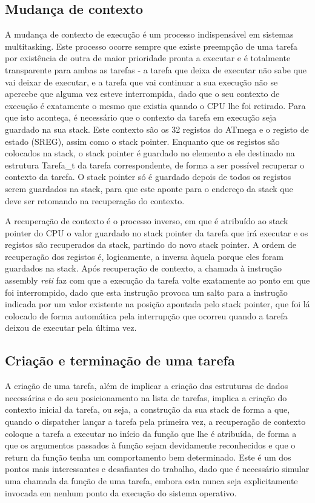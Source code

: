 \documentclass[journal]{IEEEtran}
\begin{document}
\subsection{Mudança de contexto}
A mudança de contexto de execução é um processo indispensável em sistemas multitasking.
Este processo ocorre sempre que existe preempção de uma tarefa por existência de outra de maior prioridade pronta a executar e é totalmente transparente para ambas as
tarefas - a tarefa que deixa de executar não sabe que vai deixar de executar, e a tarefa que vai continuar a sua execução não se apercebe que alguma vez esteve
interrompida, dado que o seu contexto de execução é exatamente o mesmo que existia quando o CPU lhe foi retirado.
Para que isto aconteça, é necessário que o contexto da tarefa em execução seja guardado na sua stack.
Este contexto são os 32 registos do ATmega e o registo de estado (SREG), assim como o stack pointer.
Enquanto que os registos são colocados na stack, o stack pointer é guardado no elemento a ele destinado na estrutura Tarefa\_t da tarefa correspondente, de forma a ser
possível recuperar o contexto da tarefa.
O stack pointer só é guardado depois de todos os registos serem guardados na stack, para que este aponte para o endereço da stack que deve ser retomando na recuperação do
contexto.

A recuperação de contexto é o processo inverso, em que é atribuído ao stack pointer do CPU o valor guardado no stack pointer da tarefa que irá executar e os registos são
recuperados da stack, partindo do novo stack pointer.
A ordem de recuperação dos registos é, logicamente, a inversa àquela porque eles foram guardados na stack.
Após recuperação de contexto, a chamada à instrução assembly \emph{reti} faz com que a execução da tarefa volte exatamente ao ponto em que foi interrompido, dado que esta
instrução provoca um salto para a instrução indicada por um valor existente na posição apontada pelo stack pointer, que foi lá colocado de forma automática pela
interrupção que ocorreu quando a tarefa deixou de executar pela última vez.

\subsection{Criação e terminação de uma tarefa}
A criação de uma tarefa, além de implicar a criação das estruturas de dados necessárias e do seu posicionamento na lista de tarefas, implica a criação do contexto inicial
da tarefa, ou seja, a construção da sua stack de forma a que, quando o dispatcher lançar a tarefa pela primeira vez, a recuperação de contexto coloque a tarefa a executar
no início da função que lhe é atribuída, de forma a que os argumentos passados à função sejam devidamente reconhecidos e que o return da função tenha um comportamento bem
determinado.
Este é um dos pontos mais interessantes e desafiantes do trabalho, dado que é necessário simular uma chamada da função de uma tarefa, embora esta nunca seja
explicitamente invocada em nenhum ponto da execução do sistema operativo.
\end{document}
